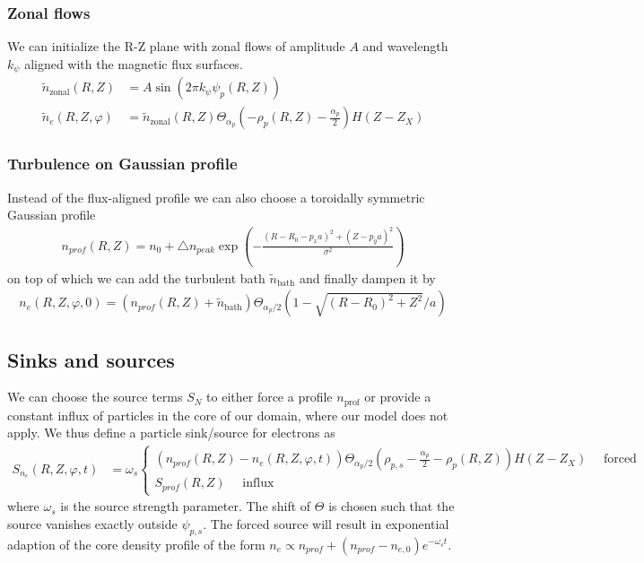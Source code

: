 \subsubsection{Zonal flows}
We can initialize the R-Z plane with zonal flows of amplitude $A$ and
wavelength $k_\psi$ aligned with the magnetic flux surfaces.
\begin{align} \label{eq:initial_zonal_flow}
    \tilde n_{\text{zonal}}(R,Z) &= A \sin (2\pi k_\psi \psi_p(R,Z)) \nonumber\\
\tilde n_e(R,Z,\varphi) &= \tilde n_{\text{zonal}}(R,Z)\Theta_{\alpha_p}\left(-\rho_p(R, Z)-\frac{\alpha_p}{2}\right) H(Z-Z_X)
\end{align}
\subsubsection{Turbulence on Gaussian profile}
Instead of the flux-aligned profile we can also choose a toroidally symmetric Gaussian profile
\begin{align} \label{eq:profile_blob}
  n_{prof}(R,Z) = n_0 + \triangle n_{peak} \exp\left( -\frac{(R - R_0 - p_x a)^2 + (Z-p_ya)^2}{\sigma^2} \right)
\end{align}
on top of which we can add the turbulent bath $\tilde n_{\text{bath}}$ and finally dampen it by
\begin{align}\label{eq:turbulence_on_gaussian}
    n_e(R,Z,\varphi,0) = (n_{prof}(R,Z) + \tilde n_{\text{bath}})\Theta_{\alpha_p/2}\left( 1- \sqrt{(R-R_0)^2 + Z^2}/a\right)
\end{align}

\subsection{Sinks and sources} \label{sec:sources}
We can choose the source terms $S_N$ to either force a profile
$n_{\text{prof}}$ or provide a constant influx of particles in the
core of our domain, where our model does not apply.
We thus define a particle sink/source for electrons as
\begin{align} \label{eq:electron_source}
  S_{n_e}(R,Z,\varphi, t) &= \omega_s \begin{cases}
      (n_{prof}(R,Z) - n_e(R,Z,\varphi, t))\Theta_{\alpha_p/2}\left( \rho_{p,s} - \frac{\alpha_p}{2} - \rho_p(R,Z) \right ) H(Z-Z_X) \quad \text{ forced}\\
    S_{prof}(R,Z)\quad \text{ influx}
    \end{cases}
\end{align}
where $\omega_s$ is the source strength parameter. The shift of $\Theta$ is chosen
such that the source vanishes exactly outside $\psi_{p,s}$.
The forced source will result in exponential adaption of the core
density profile of the form $n_e \propto n_{prof}+(n_{prof}-n_{e,0})e^{-\omega_st}$.

